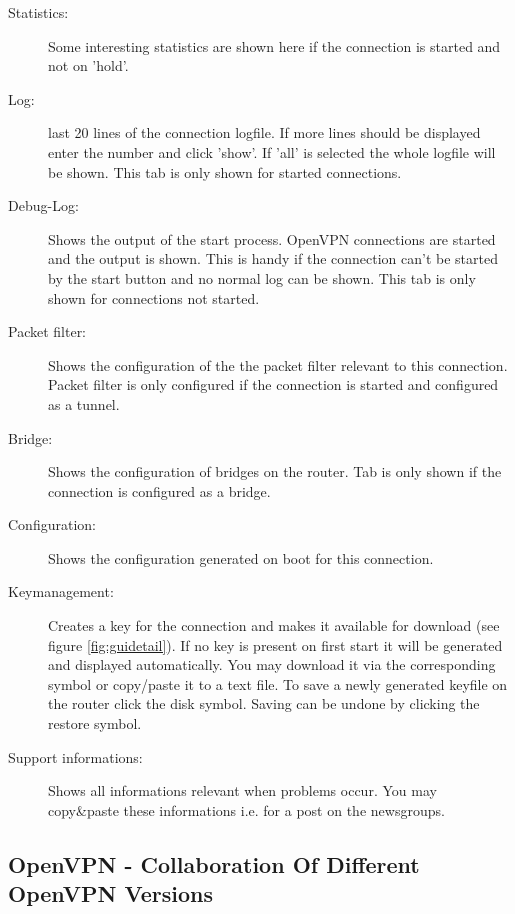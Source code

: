 \begin{description}
\item [Statistics:] Some interesting statistics are shown here 
    if the connection is started and not on 'hold'.
    
\item [Log:] last 20 lines of the connection logfile. If more lines 
    should be displayed enter the number and click 'show'. If 'all' 
    is selected the whole logfile will be shown. This tab is only shown 
    for started connections.
    
\item [Debug-Log:] Shows the output of the start process. OpenVPN 
    connections are started and the output is shown. This is handy if 
    the connection can't be started by the start button and no normal log 
    can be shown. This tab is only shown for connections not started.

\item [Packet filter:] Shows the configuration of the the packet filter 
    relevant to this connection. Packet filter is only configured 
    if the connection is started and configured as a tunnel.
    
\item [Bridge:] Shows the configuration of bridges on the router. 
    Tab is only shown if the connection is configured as a bridge.
    
\item [Configuration:] Shows the configuration generated on boot for 
    this connection.
    
\item [Keymanagement:] Creates a key for the connection and makes 
    it available for download (see figure \ref{fig:guidetail}). If no 
    key is present on first start it will be generated and displayed 
    automatically. You may download it via the corresponding symbol 
    or copy/paste it to a text file. To save a newly generated keyfile 
    on the router click the disk symbol. Saving can be undone by 
    clicking the restore symbol.

\item [Support informations:] Shows all informations relevant when 
    problems occur.  You may copy\&paste these informations i.e. 
    for a post on the newsgroups.
    
\end{description}


\subsection{OpenVPN - Collaboration Of Different OpenVPN Versions}

